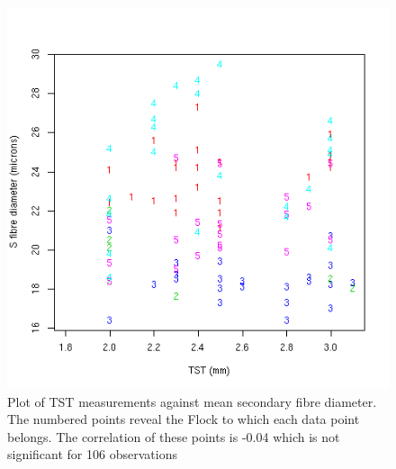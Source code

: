 %

\begin{figure}[!h]
  \centering
  \includegraphics[width=1.0\textwidth]{tstds.png}
  \caption{Plot of TST measurements against mean secondary fibre diameter. The numbered points reveal the Flock to which each data point belongs. The correlation of these points is -0.04 which is not significant for 106 observations}
  \label{fig:tstds}
\end{figure}

%

